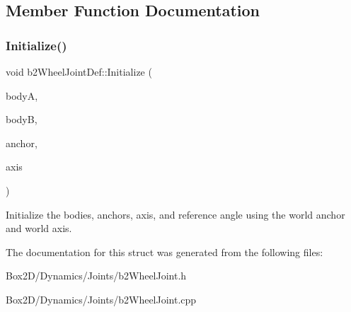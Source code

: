 \subsection{Member Function Documentation}
\mbox{\label{structb2_wheel_joint_def_af26887092d36c3cd03898401a38783e2}} 
\subsubsection{\texorpdfstring{Initialize()}{Initialize()}}
{\footnotesize\ttfamily void b2\+Wheel\+Joint\+Def\+::\+Initialize (\begin{DoxyParamCaption}\item[{\hyperlink{classb2_body}{b2\+Body} $\ast$}]{bodyA,  }\item[{\hyperlink{classb2_body}{b2\+Body} $\ast$}]{bodyB,  }\item[{const \hyperlink{structb2_vec2}{b2\+Vec2} \&}]{anchor,  }\item[{const \hyperlink{structb2_vec2}{b2\+Vec2} \&}]{axis }\end{DoxyParamCaption})}

Initialize the bodies, anchors, axis, and reference angle using the world anchor and world axis. 

The documentation for this struct was generated from the following files\+:\begin{DoxyCompactItemize}
\item 
Box2\+D/\+Dynamics/\+Joints/b2\+Wheel\+Joint.\+h\item 
Box2\+D/\+Dynamics/\+Joints/b2\+Wheel\+Joint.\+cpp\end{DoxyCompactItemize}
